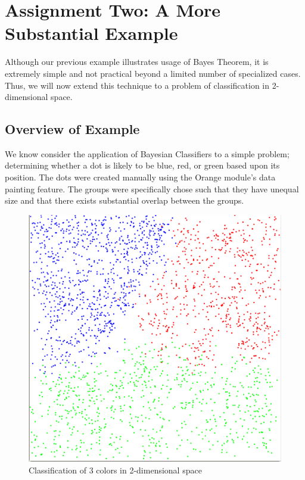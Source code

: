 

\graphicspath{{C:/Documents and Settings/amcelhinney/My Documents/GitHub/MCS507HW/MCS 507 Homework 4/MCS507--Project-3/tex/include/}}

\section{Assignment Two: A More Substantial Example} %
\label{sec: Main Problem}
Although our previous example illustrates usage of Bayes Theorem, it is extremely simple and not practical beyond a limited number of specialized cases. Thus, we will now extend this technique to a problem of classification in 2-dimensional space. 

\subsection{Overview of Example} %
We know consider the application of Bayesian Classifiers to a simple problem; determining whether a dot is likely to be blue, red, or green based upon its position. The dots were created manually using the Orange module's data painting feature. The groups were specifically chose such that they have unequal size and that there exists substantial overlap between the groups. 

\begin{figure}[H]
    \centering
       \includegraphics[width=4.5 in]{3_groups.png}
    \caption{Classification of 3 colors in 2-dimensional space}
    \label{Example Data}
\end{figure}





